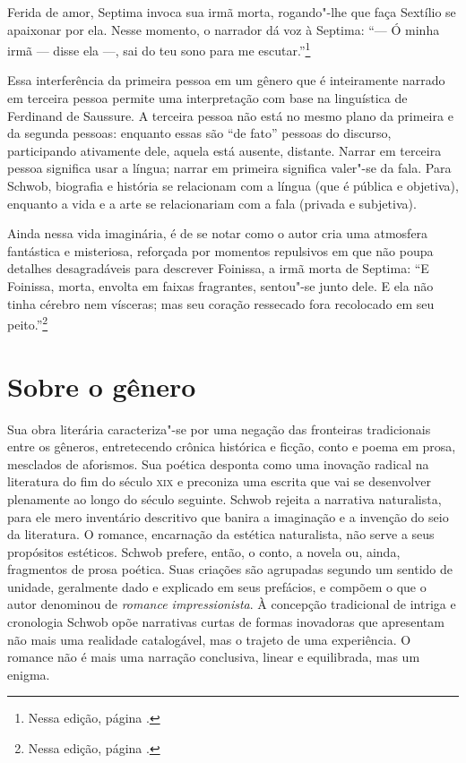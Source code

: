 Ferida de amor, Septima invoca sua irmã morta, rogando"-lhe que faça
Sextílio se apaixonar por ela. Nesse momento, o narrador dá voz à
Septima: ``--- Ó minha irmã --- disse ela ---, sai do teu sono para me escutar.''\footnote{Nessa edição, página \pageref{irma}.}

Essa interferência da primeira pessoa em um gênero que é inteiramente
narrado em terceira pessoa permite uma interpretação com base na
linguística de Ferdinand de Saussure. A terceira pessoa não está no
mesmo plano da primeira e da segunda pessoas: enquanto essas são ``de
fato'' pessoas do discurso, participando ativamente dele, aquela está
ausente, distante. Narrar em terceira pessoa significa usar a língua;
narrar em primeira significa valer"-se da fala. Para Schwob, biografia e
história se relacionam com a língua (que é pública e objetiva), enquanto
a vida e a arte se relacionariam com a fala (privada e subjetiva).

Ainda nessa vida imaginária, é de se notar como o autor cria uma
atmosfera fantástica e misteriosa, reforçada por momentos repulsivos em
que não poupa detalhes desagradáveis para descrever Foinissa, a irmã
morta de Septima: ``E Foinissa, morta, envolta em faixas fragrantes, sentou"-se junto dele.
E ela não tinha cérebro nem vísceras; mas seu coração ressecado fora
recolocado em seu peito.''\footnote{Nessa edição, página \pageref{viscera}.}


\section{Sobre o gênero}

Sua obra literária caracteriza"-se por uma negação das fronteiras
tradicionais entre os gêneros, entretecendo crônica histórica e ficção, conto e
poema em prosa, mesclados de aforismos. Sua poética desponta como uma inovação
radical na literatura do fim do século \textsc{xix} e preconiza uma escrita que vai se
desenvolver plenamente ao longo do século seguinte. Schwob rejeita a narrativa
naturalista, para ele mero inventário descritivo que banira a imaginação e a
invenção do seio da literatura. O romance, encarnação da estética naturalista,
não serve a seus propósitos estéticos. Schwob prefere, então, o conto, a novela
ou, ainda, fragmentos de prosa poética. Suas criações são agrupadas segundo um
sentido de unidade, geralmente dado e explicado em seus prefácios, e compõem o
que o autor denominou de \textit{romance impressionista}. À concepção
tradicional de intriga e cronologia Schwob opõe narrativas curtas de formas
inovadoras que apresentam não mais uma realidade catalogável, mas o trajeto de
uma experiência. O romance não é mais uma narração conclusiva, linear e
equilibrada, mas um enigma.

